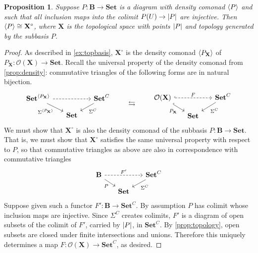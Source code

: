 \documentclass[11pt, oneside, article]{memoir}
\theoremstyle{plain}
\newtheorem{proposition}[theorem]{Proposition}
\theoremstyle{definition}
\theoremstyle{remark}
\DeclarePairedDelimiter{\gen}{\langle}{\rangle}
\DeclarePairedDelimiter{\abs}{\lvert}{\rvert}
\newcommand{\namedcat}[1]{\mathbf{#1}}
\newcommand{\cat}[1]{\mathbf{#1}}
\newcommand{\spa}[1]{\mathbf{#1}}
\newcommand{\Set}{\namedcat{Set}}
\newcommand{\CoalgOn}[2]{{#2}^{#1}}
\newcommand{\CoalgSet}[1]{\CoalgOn{#1}{\Set}}
\newcommand{\pts}[1]{{\abs{#1}}}
\newcommand{\carr}{\Sigma}
\newcommand{\car}[1]{\carr^{#1}}
\newcommand{\carC}{\car{\cC}}
\newcommand{\ph}[1]{#1}
\newcommand{\topbasis}[1]{\pP_{#1}}
\newcommand{\cmnd}[1]{{#1}}
\newcommand{\cC}{\cmnd{C}}
\newcommand{\bB}{\cat{B}}
\newcommand{\pP}{\ph{P}}
\newcommand{\cP}{\gen{\pP}}
\newcommand{\tX}{\spa{X}}
\newcommand{\cX}{\toptocmd{\tX}}
\newcommand{\CSet}{\CoalgSet{\cC}}
\newcommand{\toptocmd}[1]{{{#1}^\circ}}
\newcommand{\opens}[1]{\mathcal{O}(#1)}
\begin{document}
\begin{proposition}\label{prop:subbases}
  Suppose $\pP \colon \bB \to \Set$ is a diagram with density comonad
  $\cP$ and such that all inclusion maps into the colimit
  $\pP(U) \to \pts{\pP}$ are injective. Then $\cP\cong\cX$, where
  $\tX$ is the topological space with points $\pts{\pP}$ and topology
  generated by the subbasis $\pP$.
\end{proposition}
\begin{proof}
  As described in \cref{ex:topbasis}, $\cX$ is the density comonad
  $\gen{\topbasis{\tX}}$ of
  $\topbasis{\tX} \colon \opens{\tX} \to \Set$. Recall the universal
  property of the density comonad from \cref{prop:density}:
  commutative triangles of the following forms are in natural
  bijection.
  \[
    \begin{tikzcd}[row sep=10pt,column sep=15pt]
      \CoalgSet{\gen{\topbasis{\tX}}} && \CSet \\
      & \Set
      \arrow["{\car{\gen{\topbasis{\tX}}}}"', from=1-1, to=2-2]
      \arrow[dashed, from=1-1, to=1-3]
      \arrow["{\carC}", from=1-3, to=2-2]
    \end{tikzcd}
    \qquad
    \leftrightarrows
    \qquad
    \begin{tikzcd}[row sep=10pt,column sep=15pt]
      \opens{\tX} && \CSet \\
      & \Set
      \arrow["{\topbasis{\tX}}"', hook, from=1-1, to=2-2]
      \arrow["F", dashed, hook, from=1-1, to=1-3]
      \arrow["{\carC}", from=1-3, to=2-2]
    \end{tikzcd}
  \]
  We must show that $\cX$ is also the density comonad of the subbasis
  $\pP \colon \bB \to \Set$. That is, we must show that $\cX$
  satisfies the same universal property with respect to $\pP$, so that
  commutative triangles as above are also in correspondence with
  commutative triangles
  \[
    \begin{tikzcd}[row sep=10pt,column sep=15pt]
      \bB && \CSet \\
      & \Set
      \arrow["{\pP}"', ""{name=0, anchor=center, inner sep=0}, from=1-1, to=2-2]
      \arrow["F'", dashed, from=1-1, to=1-3]
      \arrow["\carC", ""{name=1, anchor=center, inner sep=0}, from=1-3, to=2-2]
    \end{tikzcd}
  \]
  Suppose given such a functor $F' \colon \bB \to \CSet$. By
  assumption $\pP$ has colimit whose inclusion maps are
  injective. Since $\carC$ creates colimits, $F'$ is a diagram of open
  subsets of the colimit of $F'$, carried by $\pts{\pP}$, in
  $\CSet$. By \cref{prop:topology}, open subsets are closed under
  finite intersections and unions. Therefore this uniquely determines
  a map $F \colon \opens{\tX} \to \CSet$, as desired.
\end{proof}
\end{document}
